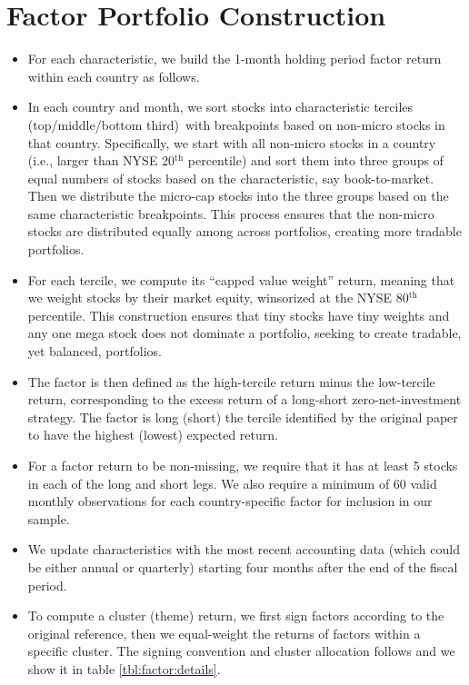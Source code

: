 \documentclass[12pt,title,fleqn]{article}
\begin{document}
\section{Factor Portfolio Construction}
\begin{itemize}
	\item For each characteristic, we build the 1-month holding period factor return within each country as follows.  
	\item In each country and month, we sort stocks  into characteristic terciles (top/middle/bottom third)\ with breakpoints based on non-micro stocks in that country.  Specifically, we start with all non-micro stocks in a country (i.e., larger than NYSE  20$^\text{th}$ percentile) and sort them into three groups of equal numbers of stocks based on the characteristic, say book-to-market. Then we distribute the micro-cap stocks into the three groups based on the same characteristic breakpoints. This process ensures that the non-micro stocks are distributed equally among across portfolios, creating more tradable portfolios.  
	\item For each tercile, we compute its ``capped value weight'' return, meaning that we weight stocks by their market equity, winsorized at the NYSE 80$^\text{th}$ percentile. This construction ensures that tiny stocks have tiny weights and any one mega stock does not dominate a portfolio, seeking to create tradable, yet balanced, portfolios.  
	\item The factor is then defined as the high-tercile return minus the low-tercile  return, corresponding to the excess return of a long-short zero-net-investment strategy.  The factor is long (short) the tercile identified by the original paper to have the highest (lowest) expected return.  
	\item For a factor return to be non-missing, we require that it has at least 5 stocks in each of the long and short legs. We also require a minimum of 60 valid monthly observations for each country-specific factor for inclusion in our sample.  
	\item We update characteristics with the most recent accounting data (which could be either annual or quarterly) starting four months after the end of the fiscal period.
	\item To compute a cluster (theme) return, we first sign factors according to the original reference, then we equal-weight the returns of factors within a specific cluster. The signing convention and cluster allocation follows  \cite{JensenKellyPedersen2023} and we show it in table \ref{tbl:factor:details}.
\end{itemize}
\end{document}
